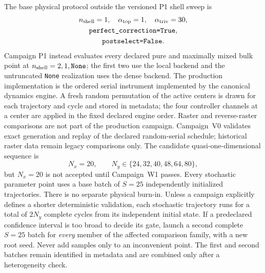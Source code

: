 \documentclass[aps,prx,twocolumn,floatfix,nofootinbib,superscriptaddress,longbibliography]{revtex4-2}
\newcommand{\code}[1]{\texttt{#1}}
\begin{document}
The base physical protocol outside the versioned P1 shell sweep is
\begin{equation}
 \begin{gathered}
 n_{\rm shell}=1,\quad \alpha_{\rm top}=1,\quad \alpha_{\rm triv}=30,\\
 \code{perfect\_correction=True},\\
 \code{postselect=False}.
 \end{gathered}
\end{equation}
Campaign P1 instead evaluates every declared pure and maximally mixed bulk point at
$n_{\rm shell}=2,1,\texttt{None}$; the first two use the local backend and the untruncated
\texttt{None} realization uses the dense backend.
The production implementation is the ordered serial instrument implemented by the
canonical dynamics engine.  A fresh random permutation of the active centers is drawn for
each trajectory and cycle and stored in metadata; the four controller channels at a center
are applied in the fixed declared engine order.  Raster and reverse-raster comparisons are
not part of the production campaign.  Campaign~V0 validates exact generation and replay of
the declared random-serial schedule; historical raster data remain legacy comparisons only.
The candidate
quasi-one-dimensional sequence is
\begin{equation}
 N_x=20,\qquad N_y\in\{24,32,40,48,64,80\},
 \label{eq:primary-sizes}
\end{equation}
but $N_x=20$ is not accepted until Campaign~W1 passes.  Every stochastic parameter point
uses a base batch of $S=25$ independently initialized trajectories.  There is no separate
physical burn-in.  Unless a campaign explicitly defines a shorter deterministic validation,
each stochastic trajectory runs for a total of $2N_y$ complete cycles from its independent
initial state.  If a predeclared
confidence interval is too broad to decide its gate, launch a second complete $S=25$
batch for \emph{every} member of the affected comparison family, with a new root seed.
Never add samples only to an inconvenient point.  The first and second batches remain
identified in metadata and are combined only after a heterogeneity check.
\end{document}
